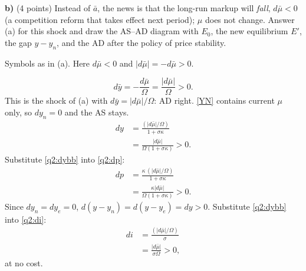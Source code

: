 \textbf{b)} (4 points) Instead of $\bar a$, the news is that the long-run markup will \emph{fall}, $d\bar\mu<0$ (a competition reform that takes
effect next period); $\mu$ does not change. Answer (a) for this shock and draw the AS--AD diagram with $E_0$, the new equilibrium
$E'$, the gap $y-y_n$, and the AD after the policy of price stability.
\resolespaco
\begin{sol}
\begin{notacao}
\item Symbols as in (a). Here $d\bar\mu<0$ and $|d\bar\mu|=-d\bar\mu>0$.
\end{notacao}
\begin{equation}
d\bar y=-\frac{d\bar\mu}{\Omega}=\frac{|d\bar\mu|}{\Omega}>0 . \label{q2:dybb}
\end{equation}
This is the shock of (a) with $d\bar y=|d\bar\mu|/\Omega$: AD right. \eqref{YN} contains current $\mu$ only, so $dy_n=0$ and the AS stays.
\begin{align}
dy&=\frac{(|d\bar\mu|/\Omega)}{1+\sigma\kappa}\nonumber\\
&=\frac{|d\bar\mu|}{\Omega(1+\sigma\kappa)}>0 . \nonumber
\end{align}
Substitute \eqref{q2:dybb} into \eqref{q2:dp}:
\begin{align}
dp&=\frac{\kappa\,(|d\bar\mu|/\Omega)}{1+\sigma\kappa}\nonumber\\
&=\frac{\kappa|d\bar\mu|}{\Omega(1+\sigma\kappa)}>0 . \nonumber
\end{align}
Since $dy_n=dy_e=0$, $d(y-y_n)=d(y-y_e)=dy>0$. Substitute \eqref{q2:dybb} into \eqref{q2:di}:
\begin{align}
di&=\frac{(|d\bar\mu|/\Omega)}{\sigma}\nonumber\\
&=\frac{|d\bar\mu|}{\sigma\Omega}>0 , \nonumber
\end{align}
at no cost.
\begin{center}
\end{center}
\end{sol}
